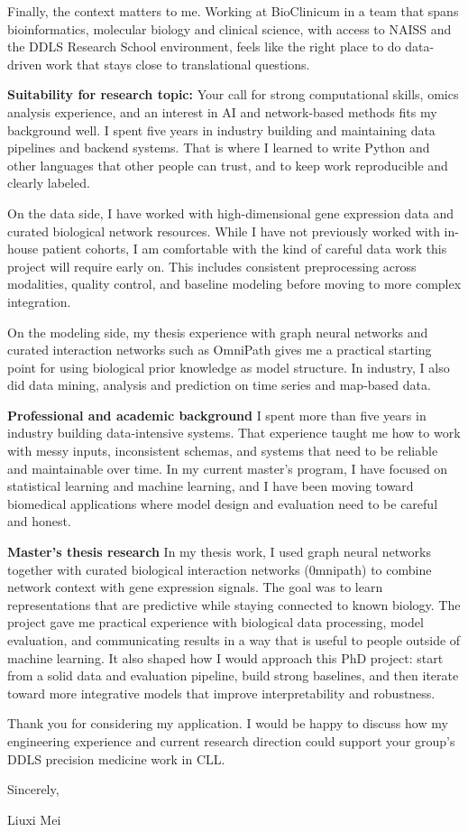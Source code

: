\documentclass[11pt,a4paper]{article}
\begin{document}
Finally, the context matters to me. Working at BioClinicum in a team that spans bioinformatics, molecular biology and clinical science, with access to NAISS and the DDLS Research School environment, feels like the right place to do data-driven work that stays close to translational questions.

\textbf{Suitability for research topic:} Your call for strong computational skills, omics analysis experience, and an interest in AI and network-based methods fits my background well. I spent five years in industry building and maintaining data pipelines and backend systems. That is where I learned to write Python and other languages that other people can trust, and to keep work reproducible and clearly labeled.

On the data side, I have worked with high-dimensional gene expression data and curated biological network resources. While I have not previously worked with in-house patient cohorts, I am comfortable with the kind of careful data work this project will require early on. This includes consistent preprocessing across modalities, quality control, and baseline modeling before moving to more complex integration.

On the modeling side, my thesis experience with graph neural networks and curated interaction networks such as OmniPath gives me a practical starting point for using biological prior knowledge as model structure. In industry, I also did data mining, analysis and prediction on time series and map-based data.

\textbf{Professional and academic background} I spent more than five years in industry building data-intensive systems. That experience taught me how to work with messy inputs, inconsistent schemas, and systems that need to be reliable and maintainable over time. In my current master's program, I have focused on statistical learning and machine learning, and I have been moving toward biomedical applications where model design and evaluation need to be careful and honest.

\textbf{Master’s thesis research} In my thesis work, I used graph neural networks together with curated biological interaction networks (0mnipath) to combine network context with gene expression signals. The goal was to learn representations that are predictive while staying connected to known biology. The project gave me practical experience with biological data processing, model evaluation, and communicating results in a way that is useful to people outside of machine learning. It also shaped how I would approach this PhD project: start from a solid data and evaluation pipeline, build strong baselines, and then iterate toward more integrative models that improve interpretability and robustness.

Thank you for considering my application. I would be happy to discuss how my engineering experience and current research direction could support your group’s DDLS precision medicine work in CLL.

Sincerely,

Liuxi Mei
\end{document}
